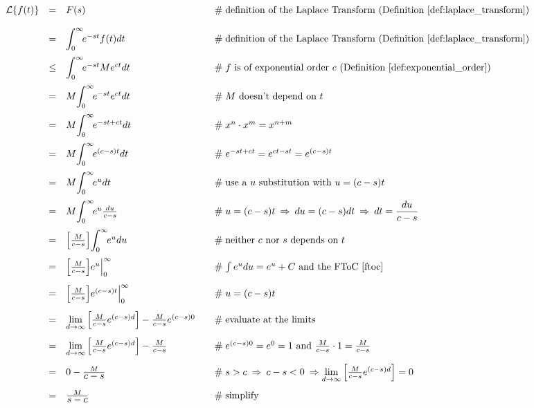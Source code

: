\documentclass{article}
\theoremstyle{definition}
\begin{document}
\begin{equation*}
\begin{array}{lllll}
\mathcal{L}\{f(t)\}
&=& F(s)
                &\quad  \mathrel{\#} \text{definition of the Laplace Transform (Definition \ref{def:laplace_transform})} \\  
[12pt] 
&=& \mathlarger{\int}_0^\infty \! e^{-st} f(t) dt
                &\quad  \mathrel{\#} \text{definition of the Laplace Transform (Definition \ref{def:laplace_transform})} \\ 
[12pt] 
&\leq& \mathlarger{\int}_0^\infty \! e^{-st} Me^{ct}dt
                &\quad  \mathrel{\#} \text{$f$ is of exponential order $c$ (Definition \ref{def:exponential_order})} \\ 
[12pt] 
&=& M \mathlarger{\int}_0^\infty \! e^{-st} e^{ct} dt
                &\quad  \mathrel{\#} \text{$M$ doesn't depend on $t$} \\   
[12pt] 
&=& M \mathlarger{\int}_0^\infty \! e^{-st + ct} dt
                &\quad  \mathrel{\#} \text{$x^n \cdot x^m = x^{n+m}$} \\      
[12pt]
&=& M \mathlarger{\int}_0^\infty\! e^{(c-s)t} dt
                &\quad  \mathrel{\#}  e^{-st + ct} = e^{ct -st} = e^{(c-s)t} \\      
[12pt] 
&=& M \mathlarger{\int}_0^\infty \! e^u dt
                &\quad  \mathrel{\#} \text{use a $u$ substitution with $u = (c-s)t$} \\     
[12pt] 
&=&  M \mathlarger{\int}_0^\infty \! e^u \frac{du}{c-s}
                &\quad  \mathrel{\#} u = (c-s)t  \: \Rightarrow \: du
                                       = (c-s) dt \: \Rightarrow \: dt = \dfrac{du}{c-s} \\     
[12pt] 
&=& \Big [ \frac{M}{c-s} \Big ] \mathlarger{\int}_0^\infty \! e^u du
                &\quad  \mathrel{\#} \text{neither $c$ nor $s$ depends on $t$} \\     
[12pt] 
&=& \Big [ \frac{M}{c-s} \Big ] e^u \Big |_0^\infty
                &\quad  \mathrel{\#} \int e^u du = e^u + C \text{ and the FToC \cite{ftoc}} \\     
[12pt] 
&=& \Big [ \frac{M}{c-s} \Big ]  e^{(c-s)t} \Big |_0^\infty
                &\quad  \mathrel{\#} u = (c-s)t \\
[12pt] 
&=& \lim\limits_{d \to \infty}\Big [\frac{M}{c-s} e^{(c-s)d} \Big ] - \frac{M}{c - s}e^{(c-s)0}
                &\quad \mathrel{\#} \text{evaluate at the limits} \\
[12pt] 
&=& \lim\limits_{d \to \infty}\Big [\frac{M}{c-s} e^{(c-s)d} \Big
] - \frac{M}{c - s}
                &\quad  \mathrel{\#} e^{(c-s)0} = e^0 = 1 \text{ and } \frac{M}{c-s} \cdot 1 = \frac{M}{c-s} \\
[12pt]
&=& 0 - \frac{M} {\mathlarger{c-s}}
                &\quad  \mathrel{\#} s > c \: \Rightarrow \: c -s < 0 \:
                \Rightarrow  \lim\limits_{d \to \infty}\Big [\frac{M}{c-s} e^{(c-s)d} \Big ] = 0 \\    
[12pt]
&=& \frac{M}{\mathlarger{s-c}}
                &\quad  \mathrel{\#} \text{simplify} 
\end{array}
\end{equation*}
\end{document}
